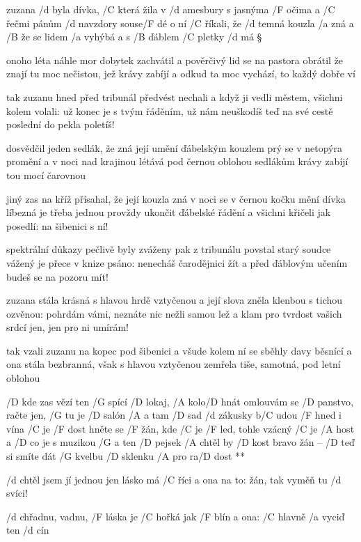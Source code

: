 
zuzana /d byla dívka, /C která žila v /d amesbury
s jasnýma /F očima a /C řečmi pánům /d navzdory
souse/F dé o ní /C říkali, že /d temná kouzla /a zná
a /B že se lidem /a vyhýbá a s /B ďáblem /C pletky /d má \S

onoho léta náhle mor dobytek zachvátil
a pověrčivý lid se na pastora obrátil
že znají tu moc nečistou, jež krávy zabíjí
a odkud ta moc vychází, to každý dobře ví \s

tak zuzanu hned před tribunál předvést nechali
a když ji vedli městem, všichni kolem volali:
už konec je s tvým řáděním, už nám neuškodíš
teď na své cestě poslední do pekla poletíš! \s

dosvědčil jeden sedlák, že zná její umění
ďábelským kouzlem prý se v netopýra promění
a v noci nad krajinou létává pod černou oblohou
sedlákům krávy zabíjí tou mocí čarovnou \s

jiný zas na kříž přísahal, že její kouzla zná
v noci se v černou kočku mění dívka líbezná
je třeba jednou provždy ukončit ďábelské řádění
a všichni křičeli jak posedlí: na šibenici s ní! \s

spektrální důkazy pečlivě byly zváženy
pak z tribunálu povstal starý soudce vážený
je přece v knize psáno: nenecháš čarodějnici žít
a před ďáblovým učením budeš se na pozoru mít! \s

zuzana stála krásná s hlavou hrdě vztyčenou
a její slova zněla klenbou s tichou ozvěnou:
pohrdám vámi, neznáte nic nežli samou lež a klam
pro tvrdost vašich srdcí jen, jen pro ni umírám! \s

tak vzali zuzanu na kopec pod šibenici
a všude kolem ní se sběhly davy běsnící
a ona stála bezbranná, však s hlavou vztyčenou
zemřela tiše, samotná, pod letní oblohou




\R  /D kde zas vězí ten /G spící /D lokaj, /A kolo/D hnát
    omlouvám se /D panstvo, račte jen, /G tu je /D salón /A a tam /D sad
    /d zákusky b/C udou /F hned i vína /C je /F dost
    hněte se /F žán, kde /C je /F led, tohle vzácný /C je /A host
    a /D co je s muzikou /G a ten /D pejsek /A chtěl by /D kost
    bravo žán -- /D teď si smíte dát /G kvelbu /D sklenku /A pro ra/D dost **

/d chtěl jsem jí jednou jen lásko má /C říci
a ona na to: žán, tak vyměň tu /d svíci!

/d chřadnu, vadnu, /F láska je /C hořká jak /F blín
a ona: /C hlavně /a vyciď ten /d cín

